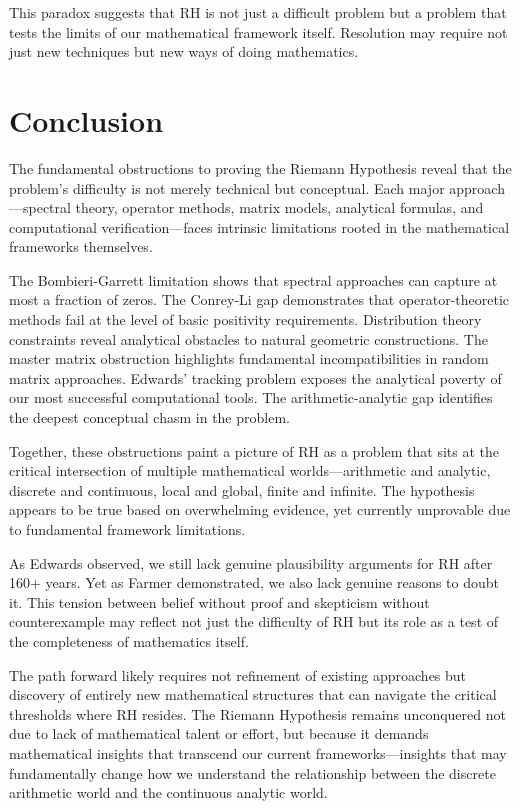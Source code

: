 \begin{remark}
This paradox suggests that RH is not just a difficult problem but a problem that tests the limits of our mathematical framework itself. Resolution may require not just new techniques but new ways of doing mathematics.
\end{remark}

\section{Conclusion}
\label{sec:obstructions_conclusion}

The fundamental obstructions to proving the Riemann Hypothesis reveal that the problem's difficulty is not merely technical but conceptual. Each major approach---spectral theory, operator methods, matrix models, analytical formulas, and computational verification---faces intrinsic limitations rooted in the mathematical frameworks themselves.

The Bombieri-Garrett limitation shows that spectral approaches can capture at most a fraction of zeros. The Conrey-Li gap demonstrates that operator-theoretic methods fail at the level of basic positivity requirements. Distribution theory constraints reveal analytical obstacles to natural geometric constructions. The master matrix obstruction highlights fundamental incompatibilities in random matrix approaches. Edwards' tracking problem exposes the analytical poverty of our most successful computational tools. The arithmetic-analytic gap identifies the deepest conceptual chasm in the problem.

Together, these obstructions paint a picture of RH as a problem that sits at the critical intersection of multiple mathematical worlds---arithmetic and analytic, discrete and continuous, local and global, finite and infinite. The hypothesis appears to be true based on overwhelming evidence, yet currently unprovable due to fundamental framework limitations.

As Edwards observed, we still lack genuine plausibility arguments for RH after 160+ years. Yet as Farmer demonstrated, we also lack genuine reasons to doubt it. This tension between belief without proof and skepticism without counterexample may reflect not just the difficulty of RH but its role as a test of the completeness of mathematics itself.

The path forward likely requires not refinement of existing approaches but discovery of entirely new mathematical structures that can navigate the critical thresholds where RH resides. The Riemann Hypothesis remains unconquered not due to lack of mathematical talent or effort, but because it demands mathematical insights that transcend our current frameworks---insights that may fundamentally change how we understand the relationship between the discrete arithmetic world and the continuous analytic world.